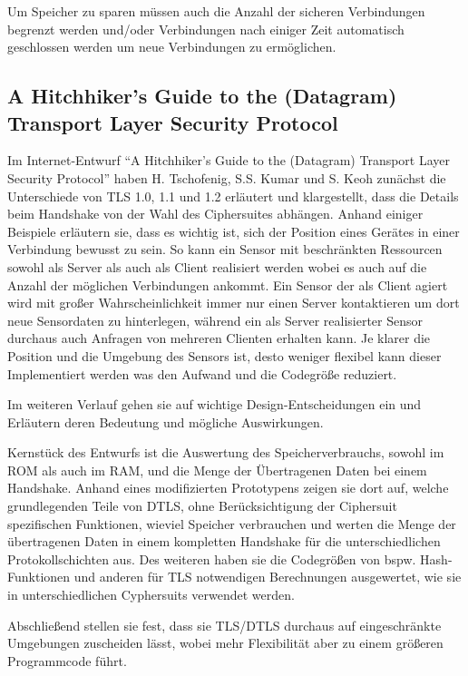 Um Speicher zu sparen müssen auch die Anzahl der sicheren Verbindungen begrenzt werden und/oder Verbindungen nach einiger Zeit
automatisch geschlossen werden um neue Verbindungen zu ermöglichen.

\subsection{A Hitchhiker's Guide to the (Datagram) Transport Layer Security Protocol}
Im Internet-Entwurf "`A Hitchhiker's Guide to the (Datagram) Transport Layer Security Protocol"' \cite{draftmintls} haben H. Tschofenig, S.S. Kumar
und S. Keoh zunächst die Unterschiede von TLS 1.0, 1.1 und 1.2 erläutert und klargestellt, dass die Details beim Handshake von der Wahl des Ciphersuites
abhängen. Anhand einiger Beispiele erläutern sie, dass es wichtig ist, sich der Position eines Gerätes in einer Verbindung bewusst zu sein.
So kann ein Sensor mit beschränkten Ressourcen sowohl als Server als auch als Client realisiert werden wobei es auch auf die Anzahl der möglichen
Verbindungen ankommt. Ein Sensor der als Client agiert wird mit großer Wahrscheinlichkeit immer nur einen Server kontaktieren um dort neue Sensordaten
zu hinterlegen, während ein als Server realisierter Sensor durchaus auch Anfragen von mehreren Clienten erhalten kann. Je klarer die Position und die
Umgebung des Sensors ist, desto weniger flexibel kann dieser Implementiert werden was den Aufwand und die Codegröße reduziert.

Im weiteren Verlauf gehen sie auf wichtige Design-Entscheidungen ein und Erläutern deren Bedeutung und mögliche Auswirkungen.

Kernstück des Entwurfs ist die Auswertung des Speicherverbrauchs, sowohl im ROM als auch im RAM, und die Menge der Übertragenen Daten bei einem Handshake.
Anhand eines modifizierten Prototypens zeigen sie dort auf, welche grundlegenden Teile von DTLS, ohne Berücksichtigung der Ciphersuit spezifischen Funktionen,
wieviel Speicher verbrauchen und werten die Menge der übertragenen Daten in einem kompletten Handshake für die unterschiedlichen Protokollschichten aus.
Des weiteren haben sie die Codegrößen von bspw. Hash-Funktionen und anderen für TLS notwendigen Berechnungen ausgewertet, wie sie in unterschiedlichen
Cyphersuits verwendet werden.

Abschließend stellen sie fest, dass sie TLS/DTLS durchaus auf eingeschränkte Umgebungen zuscheiden lässt, wobei mehr Flexibilität aber zu einem größeren Programmcode führt.


